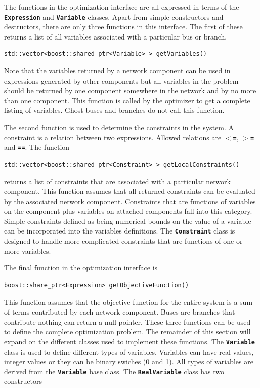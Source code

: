 \documentclass[12pt]{report} %
\begin{document}
The functions in the optimization interface are all expressed in terms of the \texttt{\textbf{Expression}} and \texttt{\textbf{Variable}} classes. Apart from simple constructors and destructors, there are only three functions in this interface. The first of these returns a list of all variables associated with a particular bus or branch.

{
\color{red}
\begin{Verbatim}[fontseries=b]
std::vector<boost::shared_ptr<Variable> > getVariables()
\end{Verbatim}
}

Note that the variables returned by a network component can be used in expressions generated by other components but all variables in the problem should be returned by one component somewhere in the network and by no more than one component. This function is called by the optimizer to get a complete listing of variables. Ghost buses and branches do not call this function.

The second function is used to determine the constraints in the system. A constraint is a relation between two expressions. Allowed relations are \texttt{\textbf{$\boldsymbol{\mathrm{<}}$=}}, \texttt{\textbf{$\boldsymbol{\mathrm{>}}$=}} and \texttt{\textbf{==}}. The function

{
\color{red}
\begin{Verbatim}[fontseries=b]
std::vector<boost::shared_ptr<Constraint> > getLocalConstraints()
\end{Verbatim}
}

returns a list of constraints that are associated with a particular network component. This function assumes that all returned constraints can be evaluated by the associated network component. Constraints that are functions of variables on the component plus variables on attached components fall into this category. Simple constraints defined as being numerical bounds on the value of a variable can be incorporated into the variables definitions. The \texttt{\textbf{Constraint}} class is designed to handle more complicated constraints that are functions of one or more variables.

The final function in the optimization interface is

{
\color{red}
\begin{Verbatim}[fontseries=b]
boost::share_ptr<Expression> getObjectiveFunction()
\end{Verbatim}
}

This function assumes that the objective function for the entire system is a sum of terms contributed by each network component. Buses are branches that contribute nothing can return a null pointer. These three functions can be used to define the complete optimization problem. The remainder of this section will expand on the different classes used to implement these functions.
The \texttt{\textbf{Variable}} class is used to define different types of variables. Variables can have real values, integer values or they can be binary swiches (0 and 1). All types of variables are derived from the \texttt{\textbf{Variable}} base class. The \texttt{\textbf{RealVariable}} class has two constructors
\end{document}
